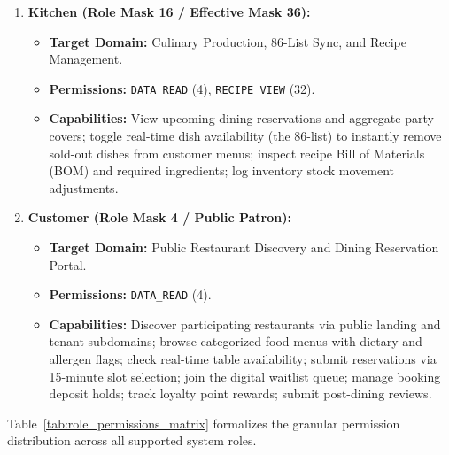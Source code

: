 \begin{enumerate}[label=\textbf{R\arabic*.}]
\begin{itemize}
    \end{itemize}
    \item \textbf{Kitchen (Role Mask 16 / Effective Mask 36):}
    \begin{itemize}
        \item \textbf{Target Domain:} Culinary Production, 86-List Sync, and Recipe Management.
        \item \textbf{Permissions:} \texttt{DATA\_READ} (4), \texttt{RECIPE\_VIEW} (32).
        \item \textbf{Capabilities:} View upcoming dining reservations and aggregate party covers; toggle real-time dish availability (the 86-list) to instantly remove sold-out dishes from customer menus; inspect recipe Bill of Materials (BOM) and required ingredients; log inventory stock movement adjustments.
    \end{itemize}
    \item \textbf{Customer (Role Mask 4 / Public Patron):}
    \begin{itemize}
        \item \textbf{Target Domain:} Public Restaurant Discovery and Dining Reservation Portal.
        \item \textbf{Permissions:} \texttt{DATA\_READ} (4).
        \item \textbf{Capabilities:} Discover participating restaurants via public landing and tenant subdomains; browse categorized food menus with dietary and allergen flags; check real-time table availability; submit reservations via 15-minute slot selection; join the digital waitlist queue; manage booking deposit holds; track loyalty point rewards; submit post-dining reviews.
    \end{itemize}
\end{enumerate}

Table~\ref{tab:role_permissions_matrix} formalizes the granular permission distribution across all supported system roles.

